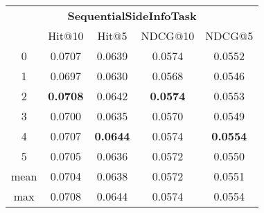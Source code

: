 \documentclass{article}
\begin{document}
 

\begin{tabular}{c|cccc}

\multicolumn{5}{c}{\textbf{SequentialSideInfoTask}} \\
\noalign{\smallskip}
\noalign{\smallskip}
\toprule
\multicolumn{1}{c}{Template ID}	&	\multicolumn{1}{|c}{Hit@10}	&	\multicolumn{1}{c}{Hit@5}	&	\multicolumn{1}{c}{NDCG@10}	&	\multicolumn{1}{c}{NDCG@5}\\
\midrule
0	&	0.0707	&	0.0639	&	0.0574	&	0.0552\\
1	&	0.0697	&	0.0630	&	0.0568	&	0.0546\\
2	&	\textbf{0.0708}	&	0.0642	&	\textbf{0.0574}	&	0.0553\\
3	&	0.0700	&	0.0635	&	0.0570	&	0.0549\\
4	&	0.0707	&	\textbf{0.0644}	&	0.0574	&	\textbf{0.0554}\\
5	&	0.0705	&	0.0636	&	0.0572	&	0.0550\\
\midrule
mean	&	0.0704	&	0.0638	&	0.0572	&	0.0551\\
max	&	0.0708	&	0.0644	&	0.0574	&	0.0554\\
\bottomrule

\end{tabular}
\end{document}
